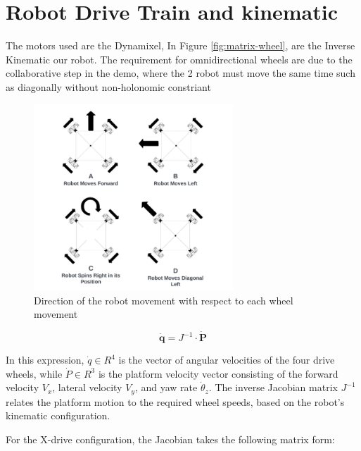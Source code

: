 \section{Robot Drive Train and kinematic}
The motors used are the Dynamixel, In Figure \ref{fig:matrix-wheel}, are the Inverse Kinematic our robot. The requirement for omnidirectional wheels are due to the collaborative step in the demo, where the 2 robot must move the same time such as diagonally without non-holonomic constriant


\begin{figure}[H]
    \centering
    \includegraphics[height=7cm]{assets/images/hardware/diagram-robot-kinematic.png}
    \caption{Direction of the robot movement with respect to each wheel movement}
    \label{fig:robot-K}
\end{figure}

\[
\dot{\mathbf{q}} = J^{-1} \cdot \dot{\mathbf{P}}
\]

In this expression, $\dot{q} \in R^4$ is the vector of angular velocities of the four drive wheels, while $\dot{P} \in R^3$ is the platform velocity vector consisting of the forward velocity $V_x$, lateral velocity $V_y$, and yaw rate $\dot{\theta}_z$. The inverse Jacobian matrix $J^{-1}$ relates the platform motion to the required wheel speeds, based on the robot's kinematic configuration.

For the X-drive configuration, the Jacobian takes the following matrix form:

